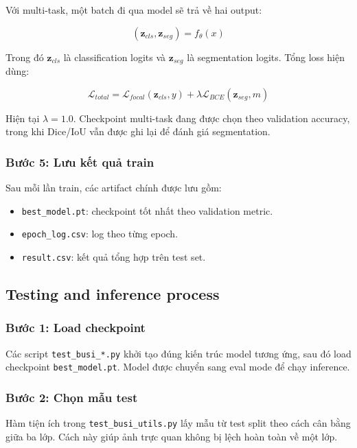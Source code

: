 \documentclass[12pt,a4paper]{article}
\begin{document}
Với multi-task, một batch đi qua model sẽ trả về hai output:

\[
(\mathbf{z}_{cls}, \mathbf{z}_{seg})
= f_{\theta}(x)
\]

Trong đó \(\mathbf{z}_{cls}\) là classification logits và \(\mathbf{z}_{seg}\) là segmentation logits. Tổng loss hiện dùng:

\[
\mathcal{L}_{total}
= \mathcal{L}_{focal}(\mathbf{z}_{cls}, y)
+ \lambda \mathcal{L}_{BCE}(\mathbf{z}_{seg}, m)
\]

Hiện tại \(\lambda = 1.0\). Checkpoint multi-task đang được chọn theo validation accuracy, trong khi Dice/IoU vẫn được ghi lại để đánh giá segmentation.

\subsubsection*{Bước 5: Lưu kết quả train}

Sau mỗi lần train, các artifact chính được lưu gồm:

\begin{itemize}
    \item \texttt{best\_model.pt}: checkpoint tốt nhất theo validation metric.
    \item \texttt{epoch\_log.csv}: log theo từng epoch.
    \item \texttt{result.csv}: kết quả tổng hợp trên test set.
\end{itemize}

\subsection{Testing and inference process}

\subsubsection*{Bước 1: Load checkpoint}

Các script \texttt{test\_busi\_*.py} khởi tạo đúng kiến trúc model tương ứng, sau đó load checkpoint \texttt{best\_model.pt}. Model được chuyển sang eval mode để chạy inference.

\subsubsection*{Bước 2: Chọn mẫu test}

Hàm tiện ích trong \texttt{test\_busi\_utils.py} lấy mẫu từ test split theo cách cân bằng giữa ba lớp. Cách này giúp ảnh trực quan không bị lệch hoàn toàn về một lớp.
\end{document}
